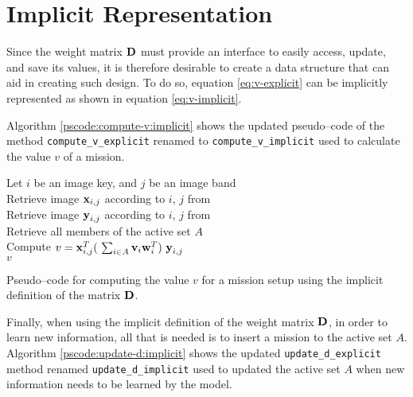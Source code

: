 \section{Implicit Representation} \label{sect:meth:implicit}

Since the weight matrix $\boldsymbol{\mathbf{D}}$ must provide an interface to easily access, update, and save its values, it is therefore desirable to create a data structure that can aid in creating such design. To do so, equation \ref{eq:v-explicit} can be implicitly represented as shown in equation \ref{eq:v-implicit}. \newline

Algorithm \ref{pscode:compute-v:implicit} shows the updated pseudo--code of the method \texttt{compute\_v\_explicit} renamed to \texttt{compute\_v\_implicit} used to calculate the value $v$ of a mission.

\vspace{0.4cm}
\begin{algorithm}[H]
    \SetAlgoLined
         {
            Let $i$ be an image key, and $j$ be an image band \\
            Retrieve image $\boldsymbol{\mathbf{x}}_{i,j}$ according to $i$, $j$ from \usno \\
            Retrieve image $\boldsymbol{\mathbf{y}}_{i,j}$ according to $i$, $j$ from \panstarrs \\
            Retrieve all members of the active set $A$ \\
            Compute $v = \boldsymbol{\mathbf{x}}_{i,j}^T (\ \sum_{i \in A} \boldsymbol{\mathbf{v}}_i \boldsymbol{\mathbf{w}}_i^T )\ \boldsymbol{\mathbf{y}}_{i,j}$ \\
            \Return $v$
        }
    \caption{Pseudo--code for computing the value $v$ for a mission setup using the implicit definition of the matrix $\boldsymbol{\mathbf{D}}$.}
    \label{pscode:compute-v:implicit}
\end{algorithm}
\vspace{0.4cm}

Finally, when using the implicit definition of the weight matrix $\boldsymbol{\mathbf{D}}$, in order to learn new information, all that is needed is to insert a mission to the active set $A$. Algorithm \ref{pscode:update-d:implicit} shows the updated \texttt{update\_d\_explicit} method renamed \texttt{update\_d\_implicit} used to updated the active set $A$ when new information needs to be learned by the model.

